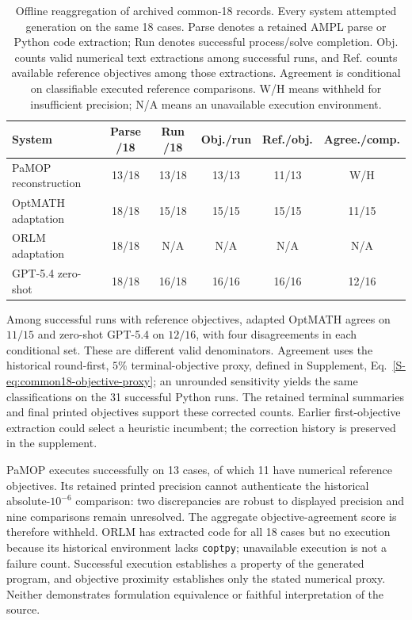 \documentclass[pdflatex,sn-basic,Numbered]{sn-jnl}
\begin{document}
\begin{table}[t]
\centering\small
\caption{Offline reaggregation of archived common-18 records. Every system attempted generation on the same 18 cases. Parse denotes a retained AMPL parse or Python code extraction; Run denotes successful process/solve completion. Obj. counts valid numerical text extractions among successful runs, and Ref. counts available reference objectives among those extractions. Agreement is conditional on classifiable executed reference comparisons. W/H means withheld for insufficient precision; N/A means an unavailable execution environment.}
\label{tab:ext-outcomes}
\setlength{\tabcolsep}{2.5pt}
\begin{tabular}{@{}lccccc@{}}
\toprule
System & Parse /18 & Run /18 & Obj./run & Ref./obj. & Agree./comp.\\
\midrule
PaMOP reconstruction & 13/18 & 13/18 & 13/13 & 11/13 & W/H\\
OptMATH adaptation & 18/18 & 15/18 & 15/15 & 15/15 & 11/15\\
ORLM adaptation & 18/18 & N/A & N/A & N/A & N/A\\
GPT-5.4 zero-shot & 18/18 & 16/18 & 16/16 & 16/16 & 12/16\\
\bottomrule
\end{tabular}
\end{table}

Among successful runs with reference objectives, adapted OptMATH agrees on $11/15$ and zero-shot GPT-5.4 on $12/16$, with four disagreements in each conditional set. These are different valid denominators. Agreement uses the historical round-first, $5\%$ terminal-objective proxy, defined in Supplement, Eq.~\eqref{S-eq:common18-objective-proxy}; an unrounded sensitivity yields the same classifications on the 31 successful Python runs. The retained terminal summaries and final printed objectives support these corrected counts. Earlier first-objective extraction could select a heuristic incumbent; the correction history is preserved in the supplement.

PaMOP executes successfully on 13 cases, of which 11 have numerical reference objectives. Its retained printed precision cannot authenticate the historical absolute-$10^{-6}$ comparison: two discrepancies are robust to displayed precision and nine comparisons remain unresolved. The aggregate objective-agreement score is therefore withheld. ORLM has extracted code for all 18 cases but no execution because its historical environment lacks \texttt{coptpy}; unavailable execution is not a failure count. Successful execution establishes a property of the generated program, and objective proximity establishes only the stated numerical proxy. Neither demonstrates formulation equivalence or faithful interpretation of the source.
\end{document}
